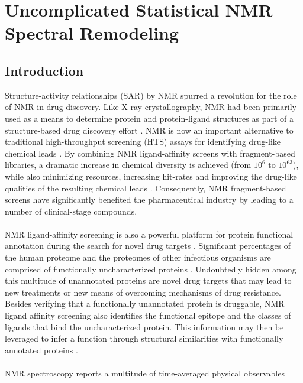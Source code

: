 
\chapter{Uncomplicated Statistical \hnmr{} NMR Spectral Remodeling}

\section{Introduction}

\begin{doublespace}
Structure-activity relationships (SAR) by NMR \cite{shuker:sci1996} spurred
a revolution for the role of NMR in drug discovery. Like X-ray crystallography,
NMR had been primarily used as a means to determine protein and protein-ligand
structures as part of a structure-based drug discovery effort
\cite{ferentz:qrb2000}. NMR is now an important alternative to traditional
high-throughput screening (HTS) assays for identifying drug-like chemical
leads \cite{pellecchia:nrdd2002,powers:eodd2009}. By combining NMR
ligand-affinity screens with fragment-based libraries, a dramatic increase in
chemical diversity is achieved (from $10^6$ to $10^{63}$), while also
minimizing resources, increasing hit-rates and improving the drug-like
qualities of the resulting chemical leads \cite{hajduk:nrdd2007}. Consequently,
NMR fragment-based screens have significantly benefited the pharmaceutical
industry by leading to a number of clinical-stage compounds.
\\\\
NMR ligand-affinity screening is also a powerful platform for protein
functional annotation during the search for novel drug targets
\cite{mercier:cchts2009,powers:ddt2008}. Significant percentages of the human
proteome and the proteomes of other infectious organisms are comprised of
functionally uncharacterized proteins \cite{muller:genres2002}. Undoubtedly
hidden among this multitude of unannotated proteins are novel drug targets
that may lead to new treatments or new means of overcoming mechanisms of drug
resistance. Besides verifying that a functionally unannotated protein is
druggable, NMR ligand affinity screening also identifies the functional
epitope and the classes of ligands that bind the uncharacterized protein.
This information may then be leveraged to infer a function through structural
similarities with functionally annotated proteins
\cite{powers:prot2006,powers:bmcrn2011}.
\\\\
NMR spectroscopy reports a multitude of time-averaged physical observables

\end{doublespace}

